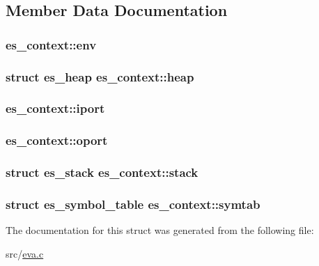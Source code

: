 \subsection{Member Data Documentation}
\hypertarget{structes__context_a6385fe9b6c2bff3edb691b808daf711e}{
\subsubsection[{env}]{ es\-\_\-context\-::env}}\label{structes__context_a6385fe9b6c2bff3edb691b808daf711e}
\hypertarget{structes__context_a6a21a5203e2219b4b5bc3cd45b3d53f2}{
\subsubsection[{heap}]{\setlength{\rightskip}{0pt plus 5cm}struct {\bf es\-\_\-heap} es\-\_\-context\-::heap}}\label{structes__context_a6a21a5203e2219b4b5bc3cd45b3d53f2}
\hypertarget{structes__context_a9c165cd13f782378c6ca5b3552f22a19}{
\subsubsection[{iport}]{ es\-\_\-context\-::iport}}\label{structes__context_a9c165cd13f782378c6ca5b3552f22a19}
\hypertarget{structes__context_ae1073fb1634ba69accc71be5eff1a461}{
\subsubsection[{oport}]{ es\-\_\-context\-::oport}}\label{structes__context_ae1073fb1634ba69accc71be5eff1a461}
\hypertarget{structes__context_a93ee18e8f9de095135648958dde5fe3b}{
\subsubsection[{stack}]{\setlength{\rightskip}{0pt plus 5cm}struct {\bf es\-\_\-stack} es\-\_\-context\-::stack}}\label{structes__context_a93ee18e8f9de095135648958dde5fe3b}
\hypertarget{structes__context_a5fbb171d5b44057e5ec545910a11decc}{
\subsubsection[{symtab}]{\setlength{\rightskip}{0pt plus 5cm}struct {\bf es\-\_\-symbol\-\_\-table} es\-\_\-context\-::symtab}}\label{structes__context_a5fbb171d5b44057e5ec545910a11decc}


The documentation for this struct was generated from the following file\-:\begin{DoxyCompactItemize}
\item 
src/\hyperlink{eva_8c}{eva.\-c}\end{DoxyCompactItemize}
